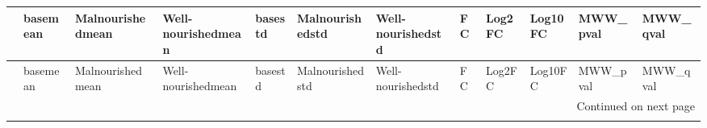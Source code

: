 \begin{longtable}{llllllllllll}
\toprule
{} &             basemean &     Malnourishedmean &   Well-nourishedmean &             basestd &       Malnourishedstd &    Well-nourishedstd &                   FC &                  Log2FC &                  Log10FC &                MWW\_pval &                MWW\_qval \\
\midrule
\endfirsthead

\toprule
{} &             basemean &     Malnourishedmean &   Well-nourishedmean &             basestd &       Malnourishedstd &    Well-nourishedstd &                   FC &                  Log2FC &                  Log10FC &                MWW\_pval &                MWW\_qval \\
\midrule
\endhead
\midrule
\multicolumn{12}{r}{{Continued on next page}} \\
\midrule
\endfoot


\end{longtable}
